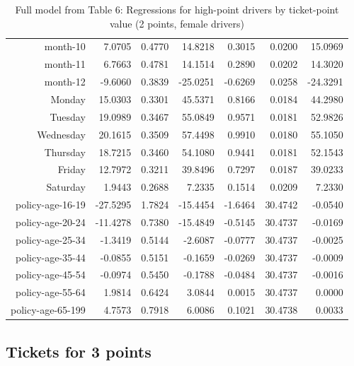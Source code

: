 \documentclass[10pt]{article}
\begin{document}
\begin{table}[ht]
\begin{tabular}{rrrrrrr}
  month-10 & 7.0705 & 0.4770 & 14.8218 & 0.3015 & 0.0200 & 15.0969 \\ 
  month-11 & 6.7663 & 0.4781 & 14.1514 & 0.2890 & 0.0202 & 14.3020 \\ 
  month-12 & -9.6060 & 0.3839 & -25.0251 & -0.6269 & 0.0258 & -24.3291 \\ 
  Monday & 15.0303 & 0.3301 & 45.5371 & 0.8166 & 0.0184 & 44.2980 \\ 
  Tuesday & 19.0989 & 0.3467 & 55.0849 & 0.9571 & 0.0181 & 52.9826 \\ 
  Wednesday & 20.1615 & 0.3509 & 57.4498 & 0.9910 & 0.0180 & 55.1050 \\ 
  Thursday & 18.7215 & 0.3460 & 54.1080 & 0.9441 & 0.0181 & 52.1543 \\ 
  Friday & 12.7972 & 0.3211 & 39.8496 & 0.7297 & 0.0187 & 39.0233 \\ 
  Saturday & 1.9443 & 0.2688 & 7.2335 & 0.1514 & 0.0209 & 7.2330 \\ 
  policy-age-16-19 & -27.5295 & 1.7824 & -15.4454 & -1.6464 & 30.4742 & -0.0540 \\ 
  policy-age-20-24 & -11.4278 & 0.7380 & -15.4849 & -0.5145 & 30.4737 & -0.0169 \\ 
  policy-age-25-34 & -1.3419 & 0.5144 & -2.6087 & -0.0777 & 30.4737 & -0.0025 \\ 
  policy-age-35-44 & -0.0855 & 0.5151 & -0.1659 & -0.0269 & 30.4737 & -0.0009 \\ 
  policy-age-45-54 & -0.0974 & 0.5450 & -0.1788 & -0.0484 & 30.4737 & -0.0016 \\ 
  policy-age-55-64 & 1.9814 & 0.6424 & 3.0844 & 0.0015 & 30.4737 & 0.0000 \\ 
  policy-age-65-199 & 4.7573 & 0.7918 & 6.0086 & 0.1021 & 30.4738 & 0.0033 \\ 
   \hline
\end{tabular}
\caption{Full model from Table 6: Regressions for high-point drivers by ticket-point value (2 points, female drivers)} 
\label{tab_6_2_pts_F}
\end{table}


\clearpage
\pagebreak




\subsection*{Tickets for 3 points}
\end{document}
